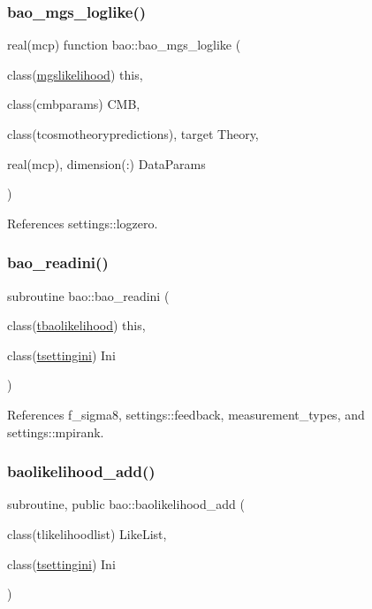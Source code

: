 \subsubsection{\texorpdfstring{bao\+\_\+mgs\+\_\+loglike()}{bao\_mgs\_loglike()}}
{\footnotesize\ttfamily real(mcp) function bao\+::bao\+\_\+mgs\+\_\+loglike (\begin{DoxyParamCaption}\item[{class(\mbox{\hyperlink{structbao_1_1mgslikelihood}{mgslikelihood}})}]{this,  }\item[{class(cmbparams)}]{C\+MB,  }\item[{class(tcosmotheorypredictions), target}]{Theory,  }\item[{real(mcp), dimension(\+:)}]{Data\+Params }\end{DoxyParamCaption})\hspace{0.3cm}{\ttfamily [private]}}



References settings\+::logzero.

\mbox{\label{namespacebao_af2e429eb5aae0de7f70a321537f77861}} 
\subsubsection{\texorpdfstring{bao\+\_\+readini()}{bao\_readini()}}
{\footnotesize\ttfamily subroutine bao\+::bao\+\_\+readini (\begin{DoxyParamCaption}\item[{class(\mbox{\hyperlink{structbao_1_1tbaolikelihood}{tbaolikelihood}})}]{this,  }\item[{class(\mbox{\hyperlink{structsettings_1_1tsettingini}{tsettingini}})}]{Ini }\end{DoxyParamCaption})\hspace{0.3cm}{\ttfamily [private]}}



References f\+\_\+sigma8, settings\+::feedback, measurement\+\_\+types, and settings\+::mpirank.

\mbox{\label{namespacebao_a1e83b8129197b47271286760d4c11866}} 
\subsubsection{\texorpdfstring{baolikelihood\+\_\+add()}{baolikelihood\_add()}}
{\footnotesize\ttfamily subroutine, public bao\+::baolikelihood\+\_\+add (\begin{DoxyParamCaption}\item[{class(tlikelihoodlist)}]{Like\+List,  }\item[{class(\mbox{\hyperlink{structsettings_1_1tsettingini}{tsettingini}})}]{Ini }\end{DoxyParamCaption})}



